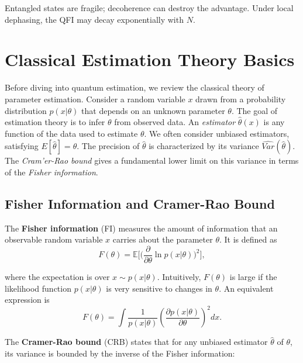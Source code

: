 Entangled states are fragile; decoherence can destroy the
advantage. Under local dephasing, the QFI may decay exponentially with
$N$.




\section{Classical Estimation Theory Basics}

\label{sec:classical}



Before diving into quantum estimation, we review the classical theory
of parameter estimation. Consider a random variable $x$ drawn from a
probability distribution $p(x|\theta)$ that depends on an unknown
parameter $\theta$. The goal of estimation theory is to infer $\theta$
from observed data. An \textit{estimator} $\hat{\theta}(x)$ is any
function of the data used to estimate $\theta$. We often consider
unbiased estimators, satisfying $E[\hat{\theta}] = \theta$. The
precision of $\hat{\theta}$ is characterized by its variance
$\widehat{Var}(\hat{\theta})$. The \textit{Cram'er-Rao bound} gives a
fundamental lower limit on this variance in terms of the
\textit{Fisher information}.



\subsection{Fisher Information and Cramer-Rao Bound}



The \textbf{Fisher information} (FI) measures the amount of
information that an observable random variable $x$ carries about the
parameter $\theta$. It is defined as
\begin{equation}
F(\theta)=\mathbb{E}\Bigg[\Big(\frac{\partial}{\partial \theta}\ln p(x|\theta)\Big)^2\Bigg],
\label{eq:FI-def}
\end{equation}

where the expectation is over $x\sim p(x|\theta)$. Intuitively,
$F(\theta)$ is large if the likelihood function $p(x|\theta)$ is very
sensitive to changes in $\theta$. An equivalent expression is
\[
F(\theta)=\int \frac{1}{p(x|\theta)}\left(\frac{\partial p(x|\theta)}{\partial \theta}\right)^2 dx.
\]


The \textbf{Cramer-Rao bound} (CRB) states that for any unbiased
estimator $\hat{\theta}$ of $\theta$, its variance is bounded by the
inverse of the Fisher information:


